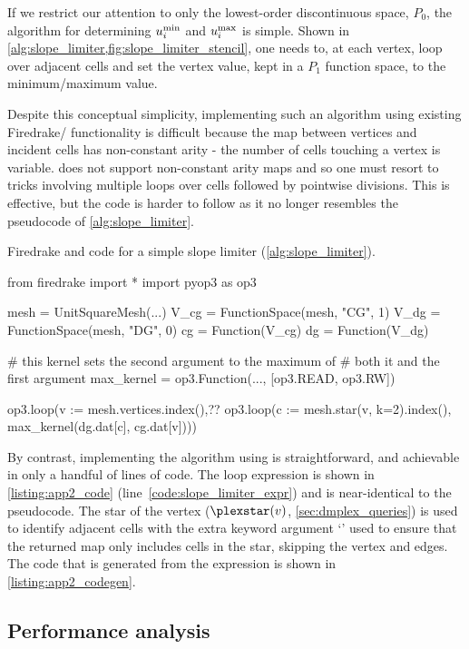 \documentclass[thesis]{subfiles}
\begin{document}
If we restrict our attention to only the lowest-order discontinuous space, $P_0$, the algorithm for determining $u_i^{\textnormal{min}}$ and $u_i^{\textnormal{max}}$ is simple.
Shown in \cref{alg:slope_limiter,fig:slope_limiter_stencil}, one needs to, at each vertex, loop over adjacent cells and set the vertex value, kept in a $P_1$ function space, to the minimum/maximum value.

Despite this conceptual simplicity, implementing such an algorithm using existing Firedrake/ functionality is difficult because the map between vertices and incident cells has non-constant arity - the number of cells touching a vertex is variable.
 does not support non-constant arity maps and so one must resort to tricks involving multiple loops over cells followed by pointwise divisions.
This is effective, but the code is harder to follow as it no longer resembles the pseudocode of \cref{alg:slope_limiter}.

\begin{listing}
  \centering
  \caption{
    Firedrake and  code for a simple slope limiter (\cref{alg:slope_limiter}).
  }
  \begin{minipage}{.9\textwidth}
    \begin{pyalg2}
      from firedrake import *
      import pyop3 as op3

      mesh = UnitSquareMesh(...)
      V_cg = FunctionSpace(mesh, "CG", 1)
      V_dg = FunctionSpace(mesh, "DG", 0)
      cg = Function(V_cg)
      dg = Function(V_dg)

      # this kernel sets the second argument to the maximum of
      # both it and the first argument
      max_kernel = op3.Function(..., [op3.READ, op3.RW])

      op3.loop(v := mesh.vertices.index(),?\label{code:slope_limiter_expr}?
               op3.loop(c := mesh.star(v, k=2).index(),
                        max_kernel(dg.dat[c], cg.dat[v])))
    \end{pyalg2}
  \end{minipage}
  \label{listing:app2_code}
\end{listing}


By contrast, implementing the algorithm using  is straightforward, and achievable in only a handful of lines of code.
The loop expression is shown in \cref{listing:app2_code} (line~\ref{code:slope_limiter_expr}) and is near-identical to the pseudocode.
The star of the vertex ($\plexstar(v)$, \cref{sec:dmplex_queries}) is used to identify adjacent cells with the extra keyword argument `' used to ensure that the returned map only includes cells in the star, skipping the vertex and edges.
The code that is generated from the expression is shown in \cref{listing:app2_codegen}.

\subsection{Performance analysis}

\end{document}
